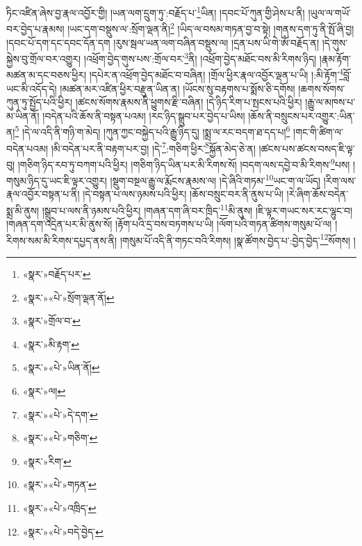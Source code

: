 ཏིང་འཛིན་ཞེས་བྱ་རྣལ་འབྱོར་གྱི། །ཡན་ལག་དྲུག་ཏུ་:བརྗོད་པ་\footnote{«སྣར་»བརྗོད་པར་}ཡིན། །དབང་པོ་ཀུན་གྱི་ཤེས་པ་ནི། །ཡུལ་ལ་གཡོ་བར་བྱེད་པ་རྣམས། །ཡང་དག་བསྡུས་ལ་:སྲོག་ལྡན་ནི།\footnote{«སྣར་»«པེ་»སྲོག་ལྡན་ནོ།} །ཡིད་ལ་བསམ་གཏན་བྱ་བ་སྟེ། །གནས་དག་ཏུ་ནི་སྤོ་ཞི་བྱ། །དབང་པོ་དག་དང་དབང་དོན་དག །རུས་སྦལ་ཡན་ལག་བཞིན་བསྡུས་ལ། །དྲན་པས་ཡི་གེ་ཨོཾ་བརྗོད་ན། །དེ་གུས་སྐྱེས་བུ་གྲོལ་བར་འགྱུར། །འཕྲོག་བྱེད་གུས་པས་:གྲོལ་བར་\footnote{«སྣར་»གྲོལ་བ་}ནི། །འཕྲོག་བྱེད་མཐོང་བས་མི་རིགས་ཉིད། །རྣམ་རྟོག་མཚན་མ་དང་བཅས་ཕྱིར། །དཔེར་ན་འཕྲོག་བྱེད་མཐོང་བ་བཞིན། །གྲོལ་ཕྱིར་རྣལ་འབྱོར་ལྡན་པ་ཡི། །:མི་རྟོག་\footnote{«སྣར་»མི་རྟག་}བློ་ཡང་མི་འདོད་དེ། །མཚན་མར་འཛིན་ཕྱིར་བརྫུན་ཡིན་ན། །ཡོངས་སུ་བརྟགས་པ་སྨོས་ཅི་དགོས། །ཆགས་སོགས་ཀུན་ཏུ་སྤྱོད་པའི་ཕྱིར། །ཚངས་སོགས་རྣམས་ནི་ཕྱུགས་རྫི་བཞིན། །དེ་ཉིད་རིག་པ་སྤངས་པའི་ཕྱིར། །རྒྱུ་ལ་མཁས་པ་མ་ཡིན་ནོ། །བདེན་པའི་ཆོས་ནི་བསྟན་པའམ། །རང་ཉིད་སྒྲུབ་པར་བྱེད་པ་ཡིས། །ཆོས་ནི་བསྲུངས་པར་འགྱུར་:ཡིན་ན།\footnote{«སྣར་»«པེ་»ཡིན་ནོ།} །དེ་ལ་འདི་ནི་གཉི་ག་མེད། །ཀུན་ཀྱང་བསྐྱེད་པའི་རྒྱུ་ཉིད་དུ། །སྨྲ་ལ་རང་བདག་ཐ་དད་པ།\footnote{«སྣར་»ལ།} །གང་གི་ཚིག་ལ་བདེན་པའམ། །མི་བདེན་པར་ནི་བརྟག་པར་བྱ། །དེ་\footnote{«སྣར་»«པེ་»དེ་དག་}:གཅིག་ཕྱིར་\footnote{«སྣར་»«པེ་»གཅིག་}སྐྱོན་མེད་ཅེ་ན། །ཚངས་པས་ཚངས་བསད་ཇི་ལྟ་བུ། །གཅིག་ཉིད་རབ་ཏུ་བཀག་པའི་ཕྱིར། །གཅིག་ཉིད་ཡིན་པར་མི་རིགས་སོ། །བདག་ལས་དབྱེ་བ་མི་རིགས་\footnote{«སྣར་»རིག་}པས། །གསུམ་ཉིད་དུ་ཡང་ཇི་ལྟར་འགྱུར། །སྡུག་བསྔལ་རྒྱུ་ལ་རྨོངས་རྣམས་ལ། །དེ་ཞིའི་གཏམ་\footnote{«སྣར་»«པེ་»གཏན་}ཡང་ག་ལ་ཡོད། །རིག་ལས་རྣལ་འབྱོར་བསྟན་པ་ནི། །དེ་བསྟན་པ་ལས་ཉམས་པའི་ཕྱིར། །ཆོས་བསྲུང་བར་ནི་ནུས་པ་ཡི། །རེ་ཞིག་ཆོས་བདེན་སྨྲ་མི་ནུས། །སྒྲུབ་པ་ལས་ནི་ཉམས་པའི་ཕྱིར། །གཞན་དག་ཞི་བར་ཁྲིད་\footnote{«སྣར་»«པེ་»འཁྲིད་}མི་ནུས། །ཇི་ལྟར་གཡང་སར་རང་ལྷུང་བ། །གཞན་དག་འདྲེན་པར་མི་ནུས་སོ། །རྟོག་པའི་དྲ་བས་བཏགས་པ་ཡི། །ལོག་པའི་གཏན་ཚིགས་གསུམ་པོ་ལ། །རིགས་སམ་མི་རིགས་དཔྱད་ནས་ནི། །གསུམ་པོ་འདི་ནི་གཏང་བའི་རིགས། །སྣ་ཚོགས་བྱེད་པ་:བྱེད་བྱེད་\footnote{«སྣར་»«པེ་»བདེ་བྱེད་}སོགས། །
